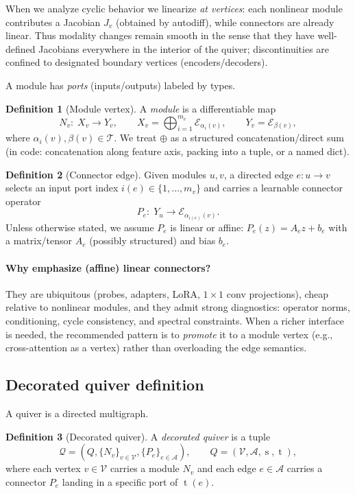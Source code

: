 \documentclass[11pt]{article}
\theoremstyle{definition}
\newtheorem{definition}{Definition}[section]
\theoremstyle{plain}
\theoremstyle{remark}
\newcommand{\mc}[1]{\mathcal{#1}}
\newcommand{\Emb}{\mc{E}}
\newcommand{\Nodes}{\mc{V}}
\newcommand{\Edges}{\mc{A}}
\newcommand{\src}{\operatorname{s}}
\newcommand{\tgt}{\operatorname{t}}
\begin{document}
When we analyze cyclic behavior we linearize \emph{at vertices}: each nonlinear module contributes a Jacobian $J_v$ (obtained by autodiff), while connectors are already linear.
Thus modality changes remain smooth in the sense that they have well-defined Jacobians everywhere in the interior of the quiver; discontinuities are confined to designated boundary vertices (encoders/decoders).

A module has \emph{ports} (inputs/outputs) labeled by types.

\begin{definition}[Module vertex]
A \emph{module} is a differentiable map
\[
N_v:\; X_v \to Y_v,
\qquad
X_v = \bigoplus_{i=1}^{m_v}\Emb_{\alpha_i(v)},
\qquad
Y_v = \Emb_{\beta(v)} ,
\]
where $\alpha_i(v),\beta(v)\in\mc{T}$.
We treat $\oplus$ as a structured concatenation/direct sum (in code: concatenation along feature axis, packing into a tuple, or a named dict).
\end{definition}

\begin{definition}[Connector edge]
Given modules $u,v$, a directed edge $e:u\to v$ selects an input port index $i(e)\in\{1,\dots,m_v\}$ and carries a learnable connector operator
\[
P_e:\; Y_u \to \Emb_{\alpha_{i(e)}(v)}.
\]
Unless otherwise stated, we assume $P_e$ is linear or affine:
$P_e(z)=A_e z + b_e$ with a matrix/tensor $A_e$ (possibly structured) and bias $b_e$.
\end{definition}

\paragraph{Why emphasize (affine) linear connectors?}
They are ubiquitous (probes, adapters, LoRA, $1\times 1$ conv projections), cheap relative to nonlinear modules, and they admit strong diagnostics:
operator norms, conditioning, cycle consistency, and spectral constraints.
When a richer interface is needed, the recommended pattern is to \emph{promote} it to a module vertex (e.g., cross-attention as a vertex) rather than overloading the edge semantics.

\subsection{Decorated quiver definition}
\label{sec:decorated-quiver}

A quiver is a directed multigraph.

\begin{definition}[Decorated quiver]
A \emph{decorated quiver} is a tuple
\[
\mc{Q}=(Q,\{N_v\}_{v\in\Nodes},\{P_e\}_{e\in\Edges}),
\qquad Q=(\Nodes,\Edges,\src,\tgt),
\]
where each vertex $v\in\Nodes$ carries a module $N_v$ and each edge $e\in\Edges$ carries a connector $P_e$ landing in a specific port of $\tgt(e)$.
\end{definition}
\end{document}
